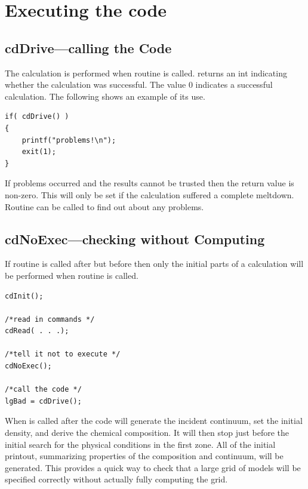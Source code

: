 \section{Executing the code}

\subsection{cdDrive---calling the Code}

The calculation is performed when routine  is called.
returns an int indicating whether the calculation was successful.
The value
0 indicates a successful calculation.
The following shows an example of
its use.
\begin{verbatim}
if( cdDrive() )
{
    printf("problems!\n");
    exit(1);
}
\end{verbatim}

If problems occurred and the results cannot be trusted then the return
value is non-zero.  This will only be set if the calculation suffered a
complete meltdown.  Routine  can be called to
find out about any problems.

\subsection{cdNoExec---checking without Computing}

If routine  is called after 
but before  then only
the initial parts of a calculation will be performed when routine
is called.
\begin{verbatim}
cdInit();

/*read in commands */
cdRead( . . .);

/*tell it not to execute */
cdNoExec();

/*call the code */
lgBad = cdDrive();
\end{verbatim}

When  is called after  the code will generate the incident
continuum, set the initial density, and derive the chemical composition.
It will then stop just before the initial search for the physical conditions
in the first zone.  All of the initial printout, summarizing properties
of the composition and continuum, will be generated.  This provides a quick
way to check that a large grid of models will be specified correctly without
actually fully computing the grid.

